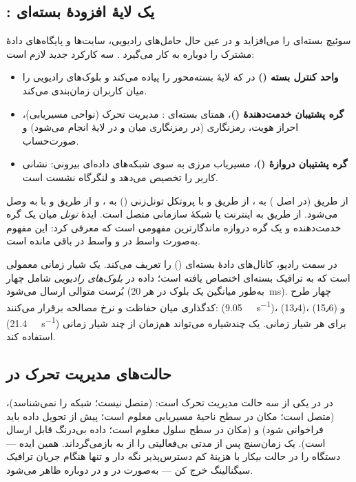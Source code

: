 \documentclass[11pt,a4paper]{article}
\begin{document}
\subsection{: یک لایهٔ افزودهٔ بسته‌ای}
 سوئیچ بسته‌ای را می‌افزاید و در عین حال حامل‌های رادیویی، سایت‌ها و پایگاه‌های
دادهٔ مشترک  را دوباره به کار می‌گیرد \cite{ts23060}. سه کارکرد جدید لازم است:
\begin{itemize}
  \item \textbf{واحد کنترل بسته ()} در  که لایهٔ بسته‌محور
         را پیاده می‌کند و بلوک‌های رادیویی را میان کاربران زمان‌بندی می‌کند.
  \item \textbf{گره پشتیبان خدمت‌دهندهٔ  ()}، همتای بسته‌ای :
        مدیریت تحرک (نواحی مسیریابی)، احراز هویت، رمزنگاری (در  رمزنگاری میان
         و  در لایهٔ  انجام می‌شود) و صورت‌حساب.
  \item \textbf{گره پشتیبان دروازهٔ  ()}، مسیریاب مرزی به سوی
        شبکه‌های داده‌ای بیرونی: نشانی  کاربر را تخصیص می‌دهد و لنگرگاه نشست است.
\end{itemize}
 از طریق  (در اصل ) به ، از طریق 
و با پروتکل تونل‌زنی  () به ، و از طریق  و با
 به  وصل می‌شود.  از طریق  به اینترنت یا شبکهٔ
سازمانی متصل است. ایدهٔ \emph{تونل} میان یک گره خدمت‌دهنده و یک گره دروازه ماندگارترین
مفهومی است که  معرفی کرد: این مفهوم به‌صورت واسط  در  و
واسط  در  باقی مانده است.

در سمت رادیو،  کانال‌های دادهٔ بسته‌ای () را تعریف می‌کند. 
یک شیار زمانی معمولی است که به ترافیک بسته‌ای اختصاص یافته است؛ داده در \emph{بلوک‌های
رادیویی} شامل چهار بُرست متوالی ارسال می‌شود (به‌طور میانگین یک بلوک در هر
\qty{20}{\milli\second}). چهار طرح کدگذاری میان حفاظت و نرخ مصالحه برقرار می‌کنند:
 (\qty{9.05}{\kilo\bit\per\second})،  (13٫4)،  (15٫6) و 
(\qty{21.4}{\kilo\bit\per\second}) برای هر شیار زمانی. یک  چندشیاره می‌تواند
هم‌زمان از چند شیار زمانی استفاده کند.

\subsection{حالت‌های مدیریت تحرک در }
 در  در یکی از سه حالت مدیریت تحرک است:
\textbf{} (متصل نیست؛ شبکه  را نمی‌شناسد)،
\textbf{} (متصل است؛ مکان در سطح ناحیهٔ مسیریابی معلوم است؛ پیش از تحویل
داده باید فراخوانی شود) و \textbf{} (مکان در سطح سلول معلوم است؛ داده بی‌درنگ
قابل ارسال است). یک زمان‌سنج پس از مدتی بی‌فعالیتی  را از  به
 بازمی‌گرداند. همین ایده --- دستگاه را در حالت بیکار با هزینهٔ کم دسترس‌پذیر
نگه دار و تنها هنگام جریان ترافیک سیگنالینگ خرج کن --- به‌صورت 
در  و  در  دوباره ظاهر می‌شود.
\end{document}
